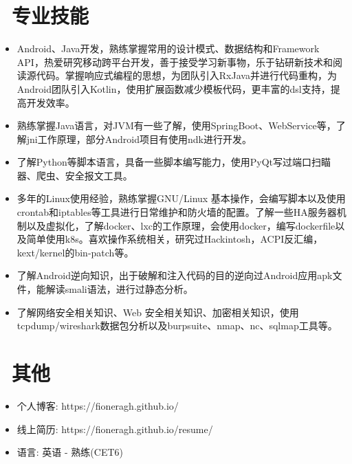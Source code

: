 \documentclass{resume}
\begin{document}

\section{\faCogs\ 专业技能}
\begin{itemize}[parsep=0.5ex]
  \item Android、Java开发，熟练掌握常用的设计模式、数据结构和Framework API，热爱研究移动跨平台开发，善于接受学习新事物，乐于钻研新技术和阅读源代码。掌握响应式编程的思想，为团队引入RxJava并进行代码重构，为Android团队引入Kotlin，使用扩展函数减少模板代码，更丰富的dsl支持，提高开发效率。
  \item 熟练掌握Java语言，对JVM有一些了解，使用SpringBoot、WebService等，了解jni工作原理，部分Android项目有使用ndk进行开发。
  \item 了解Python等脚本语言，具备一些脚本编写能力，使用PyQt写过端口扫瞄器、爬虫、安全报文工具。
  \item 多年的Linux使用经验，熟练掌握GNU/Linux 基本操作，会编写脚本以及使用crontab和iptables等工具进行日常维护和防火墙的配置。了解一些HA服务器机制以及虚拟化，了解docker、lxc的工作原理，会使用docker，编写dockerfile以及简单使用k8s。喜欢操作系统相关，研究过Hackintosh，ACPI反汇编，kext/kernel的bin-patch等。
  \item 了解Android逆向知识，出于破解和注入代码的目的逆向过Android应用apk文件，能解读smali语法，进行过静态分析。
  \item 了解网络安全相关知识、Web 安全相关知识、加密相关知识，使用tcpdump/wireshark数据包分析以及burpsuite、nmap、nc、sqlmap工具等。
\end{itemize}


\section{\faInfo\ 其他}
\begin{itemize}[parsep=0.5ex]
  \item 个人博客: https://fioneragh.github.io/
  \item 线上简历: https://fioneragh.github.io/resume/
  \item 语言: 英语 - 熟练(CET6)
\end{itemize}

%
%
\end{document}
